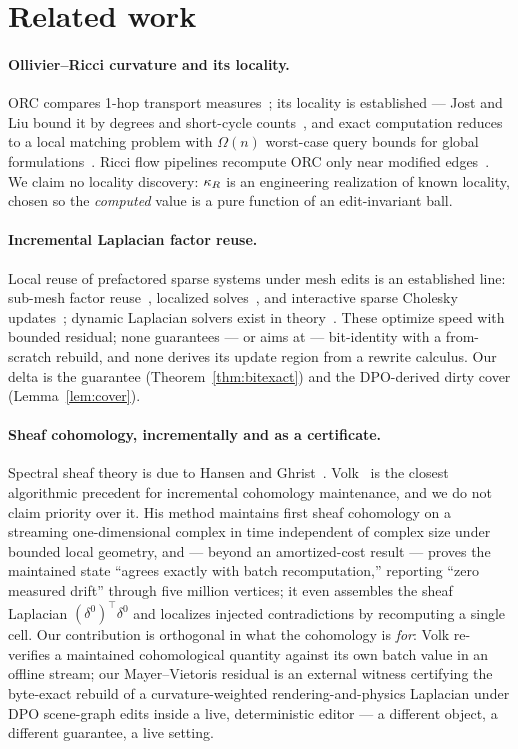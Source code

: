 \section{Related work}\label{sec:related}

\paragraph*{Ollivier--Ricci curvature and its locality.}
ORC compares 1-hop transport measures~\cite{ollivier2009ricci}; its locality
is established --- Jost and Liu bound it by degrees and short-cycle
counts~\cite{jost2014ollivier}, and exact computation reduces to a local
matching problem with $\Omega(n)$ worst-case query bounds for global
formulations~\cite{dasgupta2023ricci}. Ricci flow pipelines recompute ORC only
near modified edges~\cite{ni2019community}. We claim no locality discovery:
$\kappa_R$ is an engineering realization of known locality, chosen so the
\emph{computed} value is a pure function of an edit-invariant ball.

\paragraph*{Incremental Laplacian factor reuse.}
Local reuse of prefactored sparse systems under mesh edits is an established
line: sub-mesh factor reuse~\cite{herholz2018factor}, localized
solves~\cite{herholz2017localized}, and interactive sparse Cholesky
updates~\cite{herholz2020sparse}; dynamic Laplacian solvers exist in
theory~\cite{durfee2019fully}. These optimize speed with bounded residual;
none guarantees --- or aims at --- bit-identity with a from-scratch rebuild,
and none derives its update region from a rewrite calculus. Our delta is the
guarantee (Theorem~\ref{thm:bitexact}) and the DPO-derived dirty cover
(Lemma~\ref{lem:cover}).

\paragraph*{Sheaf cohomology, incrementally and as a certificate.}
Spectral sheaf theory is due to Hansen and
Ghrist~\cite{hansen2019spectral}. Volk~\cite{volk2026incremental} is the
closest algorithmic precedent for incremental cohomology maintenance, and we
do not claim priority over it. His method maintains first sheaf cohomology on
a streaming one-dimensional complex in time independent of complex size under
bounded local geometry, and --- beyond an amortized-cost result --- proves
the maintained state ``agrees exactly with batch recomputation,'' reporting
``zero measured drift'' through five million vertices; it even assembles the
sheaf Laplacian $(\delta^0)^\top\delta^0$ and localizes injected
contradictions by recomputing a single cell. Our contribution is orthogonal
in what the cohomology is \emph{for}: Volk re-verifies a maintained
cohomological quantity against its own batch value in an offline stream; our
Mayer--Vietoris residual is an external witness certifying the byte-exact
rebuild of a curvature-weighted rendering-and-physics Laplacian under DPO
scene-graph edits inside a live, deterministic editor --- a different object,
a different guarantee, a live setting.


